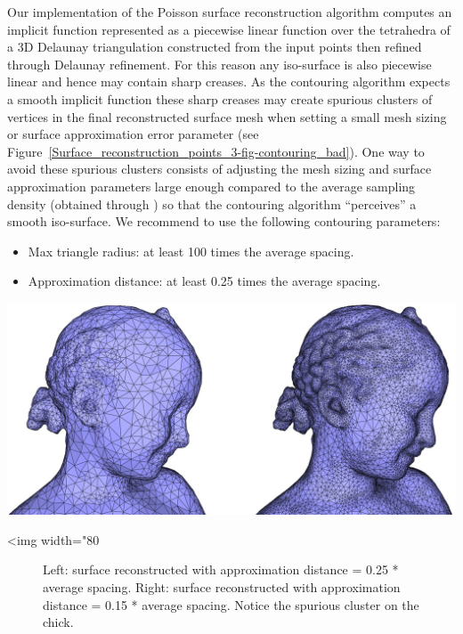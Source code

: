Our implementation of the Poisson surface reconstruction algorithm computes an implicit function represented as a piecewise linear function over the tetrahedra of a 3D Delaunay triangulation constructed from the input points then refined through Delaunay refinement. For this reason any iso-surface is also piecewise linear and hence may contain sharp creases. As the contouring algorithm  expects a smooth implicit function these sharp creases may create spurious clusters of vertices in the final reconstructed surface mesh when setting a small mesh sizing or surface approximation error parameter (see Figure~\ref{Surface_reconstruction_points_3-fig-contouring_bad}). One way to avoid these spurious clusters consists of adjusting the mesh sizing and surface approximation parameters large enough compared to the average sampling density (obtained through ) so that the contouring algorithm ``perceives'' a smooth iso-surface. We recommend to use the following contouring parameters:
\begin{itemize}
\item Max triangle radius: at least 100 times the average spacing.
\item Approximation distance: at least 0.25 times the average spacing.
\end{itemize}

\begin{center}
    \label{Surface_reconstruction_points_3-fig-contouring_bad}
    \begin{ccTexOnly}
\includegraphics[width=1.0\textwidth]{Surface_reconstruction_points_3/contouring_bad}
    \end{ccTexOnly}
    \begin{ccHtmlOnly}
        <img width="80%
    \end{ccHtmlOnly}
    \begin{figure}[h]
        \caption{Left: surface reconstructed with approximation distance = 0.25 * average spacing.
                 Right: surface reconstructed with approximation distance = 0.15 * average spacing. Notice the spurious cluster on the chick.}
    \end{figure}
\end{center}


